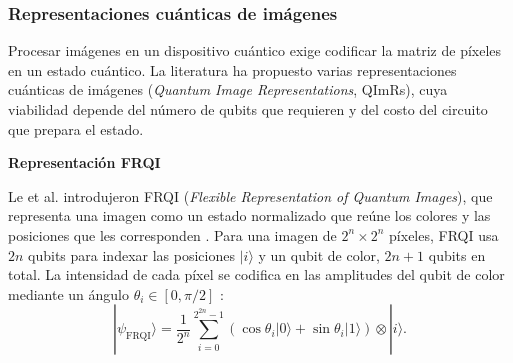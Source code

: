 
\subsubsection{Representaciones cuánticas de imágenes}
\label{sec:imagenes_cuanticas}

Procesar imágenes en un dispositivo cuántico exige codificar la matriz de píxeles en un estado cuántico. La literatura ha propuesto varias representaciones cuánticas de imágenes (\textit{Quantum Image Representations}, QImRs), cuya viabilidad depende del número de qubits que requieren y del costo del circuito que prepara el estado.

\textbf{Representación FRQI}

Le et al. introdujeron FRQI (\textit{Flexible Representation of Quantum Images}), que representa una imagen como un estado normalizado que reúne los colores y las posiciones que les corresponden \cite{Le2011FRQI}.
Para una imagen de $2^n \times 2^n$ píxeles, FRQI usa $2n$ qubits para indexar las posiciones $|i\rangle$ y un qubit de color, $2n+1$ qubits en total. La intensidad de cada píxel se codifica en las amplitudes del qubit de color mediante un ángulo $\theta_i \in [0, \pi/2]$ \cite{Le2011FRQI}:
\begin{equation}
  |\psi_{\text{FRQI}}\rangle = \frac{1}{2^n} \sum_{i=0}^{2^{2n}-1} \left( \cos\theta_i |0\rangle + \sin\theta_i |1\rangle \right) \otimes |i\rangle.
\end{equation}

